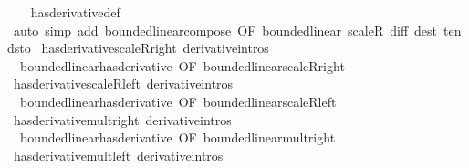 \begin{isabellebody}
%
\isadelimproof
\ \ %
\endisadelimproof
%
\isatagproof
{}\isamarkupfalse%
\ has{\isacharunderscore}{\kern0pt}derivative{\isacharunderscore}{\kern0pt}def\isanewline
\ \ \isamarkupfalse%
\ {\isacharparenleft}{\kern0pt}auto\ simp\ add{\isacharcolon}{\kern0pt}\ bounded{\isacharunderscore}{\kern0pt}linear{\isacharunderscore}{\kern0pt}compose\ {\isacharbrackleft}{\kern0pt}OF\ bounded{\isacharunderscore}{\kern0pt}linear{\isacharbrackright}{\kern0pt}\ scaleR\ diff\ dest{\isacharcolon}{\kern0pt}\ tendsto{\isacharparenright}{\kern0pt}%
\endisatagproof
{\isafoldproof}%
%
\isadelimproof
\isanewline
%
\endisadelimproof
\isanewline
{}\isamarkupfalse%
\ has{\isacharunderscore}{\kern0pt}derivative{\isacharunderscore}{\kern0pt}scaleR{\isacharunderscore}{\kern0pt}right\ {\isacharbrackleft}{\kern0pt}derivative{\isacharunderscore}{\kern0pt}intros{\isacharbrackright}{\kern0pt}\ {\isacharequal}{\kern0pt}\isanewline
\ \ bounded{\isacharunderscore}{\kern0pt}linear{\isachardot}{\kern0pt}has{\isacharunderscore}{\kern0pt}derivative\ {\isacharbrackleft}{\kern0pt}OF\ bounded{\isacharunderscore}{\kern0pt}linear{\isacharunderscore}{\kern0pt}scaleR{\isacharunderscore}{\kern0pt}right{\isacharbrackright}{\kern0pt}\isanewline
\isanewline
{}\isamarkupfalse%
\ has{\isacharunderscore}{\kern0pt}derivative{\isacharunderscore}{\kern0pt}scaleR{\isacharunderscore}{\kern0pt}left\ {\isacharbrackleft}{\kern0pt}derivative{\isacharunderscore}{\kern0pt}intros{\isacharbrackright}{\kern0pt}\ {\isacharequal}{\kern0pt}\isanewline
\ \ bounded{\isacharunderscore}{\kern0pt}linear{\isachardot}{\kern0pt}has{\isacharunderscore}{\kern0pt}derivative\ {\isacharbrackleft}{\kern0pt}OF\ bounded{\isacharunderscore}{\kern0pt}linear{\isacharunderscore}{\kern0pt}scaleR{\isacharunderscore}{\kern0pt}left{\isacharbrackright}{\kern0pt}\isanewline
\isanewline
{}\isamarkupfalse%
\ has{\isacharunderscore}{\kern0pt}derivative{\isacharunderscore}{\kern0pt}mult{\isacharunderscore}{\kern0pt}right\ {\isacharbrackleft}{\kern0pt}derivative{\isacharunderscore}{\kern0pt}intros{\isacharbrackright}{\kern0pt}\ {\isacharequal}{\kern0pt}\isanewline
\ \ bounded{\isacharunderscore}{\kern0pt}linear{\isachardot}{\kern0pt}has{\isacharunderscore}{\kern0pt}derivative\ {\isacharbrackleft}{\kern0pt}OF\ bounded{\isacharunderscore}{\kern0pt}linear{\isacharunderscore}{\kern0pt}mult{\isacharunderscore}{\kern0pt}right{\isacharbrackright}{\kern0pt}\isanewline
\isanewline
{}\isamarkupfalse%
\ has{\isacharunderscore}{\kern0pt}derivative{\isacharunderscore}{\kern0pt}mult{\isacharunderscore}{\kern0pt}left\ {\isacharbrackleft}{\kern0pt}derivative{\isacharunderscore}{\kern0pt}intros{\isacharbrackright}{\kern0pt}\ {\isacharequal}{\kern0pt}\isanewline

\end{isabellebody}
